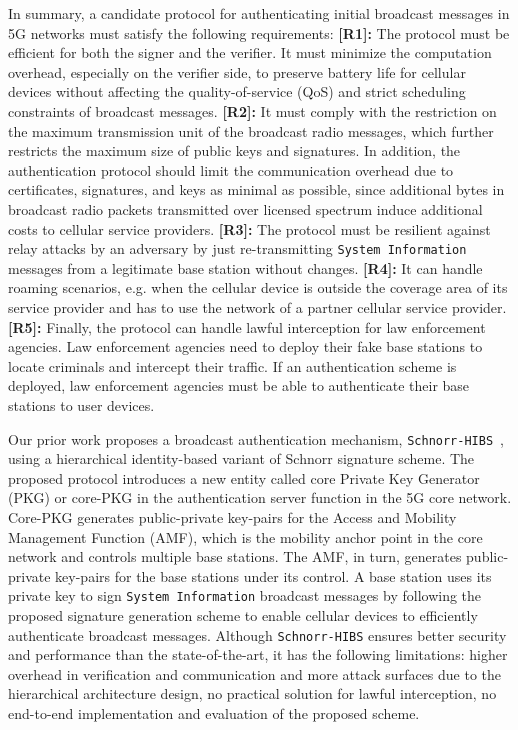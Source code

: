 In summary, a candidate protocol for authenticating initial broadcast messages in 5G networks must satisfy the following requirements: \textbf{[R1]:} The protocol must be efficient for both the signer and the verifier. It must minimize the computation overhead, especially on the verifier side, to preserve battery life for cellular devices without affecting the quality-of-service (QoS) and strict scheduling constraints of broadcast messages. 
\textbf{[R2]:} It must comply with the restriction on the maximum transmission unit of the broadcast radio messages, which further restricts the maximum size of public keys and signatures. In addition, the authentication protocol should limit the communication overhead due to certificates, signatures, and keys as minimal as possible, since additional bytes in broadcast radio packets transmitted over licensed spectrum induce additional costs to cellular service providers. 
\textbf{[R3]:} The protocol must be resilient against relay attacks by an adversary by just re-transmitting \texttt{System Information} messages from a legitimate base station without changes. \textbf{[R4]:} It can handle roaming scenarios, e.g. when the cellular device is outside the coverage area of its service provider and has to use the network of a partner cellular service provider. \textbf{[R5]:} Finally, the protocol can handle lawful interception for law enforcement agencies. Law enforcement agencies need to deploy their fake base stations to locate criminals and intercept their traffic. If an authentication scheme is deployed, law enforcement agencies must be able to authenticate their base stations to user devices.  

Our prior work proposes a broadcast authentication mechanism, \texttt{Schnorr-HIBS}~\cite{singla2021look}, using a hierarchical identity-based variant of Schnorr signature scheme. The proposed protocol introduces a new entity called core Private Key Generator (PKG) or core-PKG in the authentication server function in the 5G core network. Core-PKG generates public-private key-pairs for the Access and Mobility Management Function (AMF), which is the mobility anchor point in the core network and controls multiple base stations.
The AMF, in turn, generates public-private key-pairs for the base stations under its control. A base station uses its private key to sign \texttt{System Information} broadcast messages by following the proposed signature generation scheme to enable cellular devices to efficiently authenticate broadcast messages.
Although \texttt{Schnorr-HIBS} ensures better security and performance than the state-of-the-art, it has the following limitations:  higher overhead in verification and communication 
and more attack surfaces due to the hierarchical architecture design,  no practical solution for lawful interception, 
 no end-to-end implementation and evaluation of the proposed scheme.

